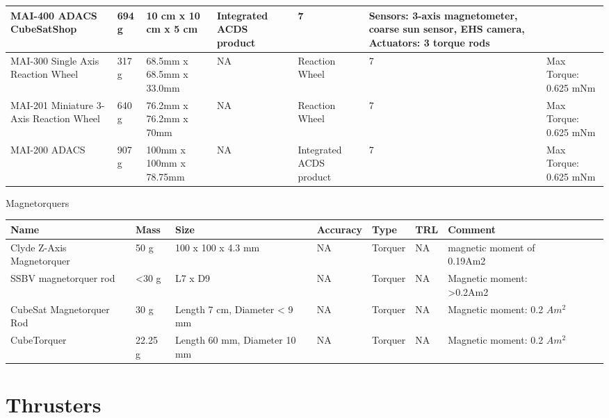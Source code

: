 \begin{center}
\begin{tabular}{ | p{2cm} | p{1.25cm} | p{2cm} | l | l | l | p{2cm} |}
	   MAI-400 ADACS CubeSatShop \cite{CubeShop} & 694 g & 10 cm x 10 cm x 5 cm	& Integrated ACDS product & 7 & Sensors: 3-axis magnetometer, coarse sun sensor, EHS camera, Actuators: 3 torque rods \\ \hline
	   
	   MAI-300 Single Axis Reaction Wheel \cite{CubeShop} & 317 g & 68.5mm x 68.5mm x 33.0mm & NA & Reaction Wheel & 7 & Max Torque: 0.625 mNm \\ \hline
	   
	   MAI-201 Miniature 3-Axis Reaction Wheel \cite{CubeShop} & 640 g & 76.2mm x 76.2mm x 70mm & NA & Reaction Wheel & 7 & Max Torque: 0.625 mNm \\ \hline
	   
	   MAI-200 ADACS \cite{CubeShop} & 907 g & 100mm x 100mm x 78.75mm & NA & Integrated ACDS product & 7 & Max Torque: 0.625 mNm \\ \hline
     \end{tabular}
\end{center}

Magnetorquers\\

\begin{center}
     \begin{tabular}{ |p{2cm} | p{1cm} | p{1cm} |  p{1cm} | l | p{2cm} | l | p{4cm} | p{1cm} | p{3cm} |  }
     \hline

      {\bf Name} & {\bf Mass} & {\bf Size} & {\bf Accuracy} & {\bf Type} & {\bf TRL} & {\bf Comment}  \\ \hline
      
       Clyde Z-Axis Magnetorquer & 50 g & 100 x 100 x 4.3 mm & NA & Torquer & NA & magnetic moment of 0.19Am2 \\ \hline
       
	   SSBV magnetorquer rod & <30 g & L7 x D9 & NA & Torquer & NA & Magnetic moment: >0.2Am2 \\ \hline
	   
	   CubeSat Magnetorquer Rod \cite{CubeShop} & 30 g & Length 7 cm, Diameter < 9 mm & NA & Torquer & NA & Magnetic moment: 0.2 $Am^2$ \\ \hline
	   
	   CubeTorquer \cite{CubeShop} & 22.25 g & Length 60 mm, Diameter 10 mm & NA & Torquer & NA & Magnetic moment: 0.2 $Am^2$ \\ \hline
     \end{tabular}
\end{center}

\section{Thrusters}

